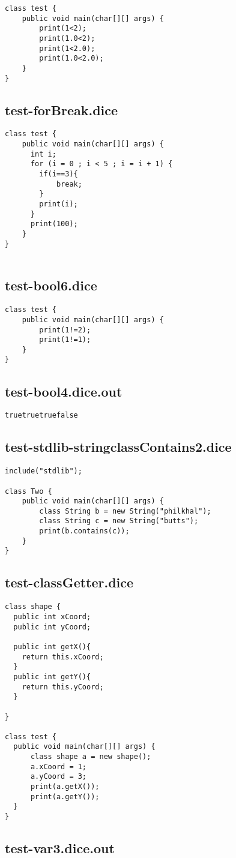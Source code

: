 \begin{verbatim}
class test {
	public void main(char[][] args) {
		print(1<2);
		print(1.0<2);
		print(1<2.0);
		print(1.0<2.0);
	}
}
\end{verbatim}\pagebreak\subsection{test-forBreak.dice}
\begin{verbatim}
class test {
	public void main(char[][] args) {
	  int i;
	  for (i = 0 ; i < 5 ; i = i + 1) {
	  	if(i==3){
	  		break;
	  	}
	    print(i);
	  }
	  print(100);
	}
}


\end{verbatim}\pagebreak\subsection{test-bool6.dice}
\begin{verbatim}
class test {
	public void main(char[][] args) {
		print(1!=2);
		print(1!=1);
	}
}
\end{verbatim}\pagebreak\subsection{test-bool4.dice.out}
\begin{verbatim}
truetruetruefalse
\end{verbatim}\pagebreak\subsection{test-stdlib-stringclassContains2.dice}
\begin{verbatim}
include("stdlib");

class Two {
	public void main(char[][] args) {
        class String b = new String("philkhal");
        class String c = new String("butts");
        print(b.contains(c));
	}
}

\end{verbatim}\pagebreak\subsection{test-classGetter.dice}
\begin{verbatim}
class shape {
  public int xCoord;
  public int yCoord;

  public int getX(){
  	return this.xCoord;
  }
  public int getY(){
   	return this.yCoord;
  }

}

class test {
  public void main(char[][] args) {
      class shape a = new shape(); 
      a.xCoord = 1;
      a.yCoord = 3;
      print(a.getX());
      print(a.getY());
  }
}
\end{verbatim}\pagebreak\subsection{test-var3.dice.out}
